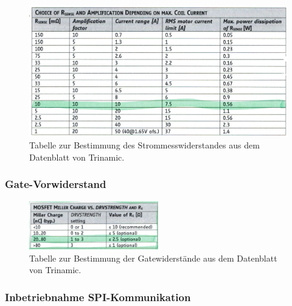 \begin{figure}[H]
	\centering
	\includegraphics[width=\textwidth]{graphics/Tabelle_Shunts.png}
	\caption{Tabelle zur Bestimmung des Strommesswiderstandes aus dem Datenblatt von Trinamic.\cite[S.31]{trinamicmotion_control_gmbh__co_kg_tmc6200_2019}}
	\label{fig:Tabelle_Shunts}
\end{figure}

\subsubsection{Gate-Vorwiderstand}\label{Appendix:Gate_Vorwiderstand}

\begin{figure}[H]
	\centering
	\includegraphics[width=0.5\textwidth]{graphics/Tabelle_Gatewiderstaende.png}
	\caption{Tabelle zur Bestimmung der Gatewiderstände aus dem Datenblatt von Trinamic.\cite[S.13]{trinamicmotion_control_gmbh__co_kg_tmc6200_2019}}
	\label{fig:Tabelle_Gatewiderstaende}
\end{figure}

\subsubsection{Inbetriebnahme SPI-Kommunikation}\label{Appendix:TMC6200_SPI}

%

